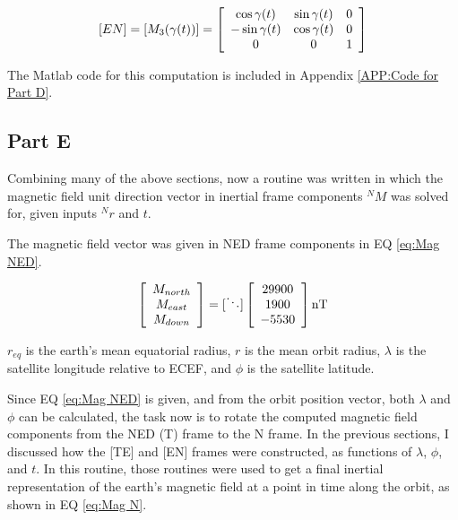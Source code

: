 \documentclass[]{aiaa-tc}%
\newcommand{\brackets} [1] {\left[ #1 \right]}
\newcommand{\arrayb}[2]{\brackets{ \begin{array}{#1}  #2 \end{array} } }
\begin{document}
\begin{equation}
	\label{EQ:ECI2ECF DCM}
	[EN]=[M_3(\gamma(t))] = 
	\arrayb{c c c}{
		\cos{\gamma(t)} 	& 	\sin{\gamma(t)} 	&	0	\\
		-\sin{\gamma(t)} 	&	\cos{\gamma(t)} 	& 	0	\\
		0			&		0		&	1			
	}
\end{equation}

The Matlab code for this computation is included in Appendix \ref{APP:Code for Part D}.



\subsection{Part E}
Combining many of the above sections, now a routine was written in which the magnetic field unit direction vector in inertial frame components $^NM$ was solved for, given inputs $^Nr$ and $t$. 

The magnetic field vector was given in NED frame components in EQ \ref{eq:Mag NED}.

\begin{equation}
	\label{eq:Mag NED}
	\arrayb{c}{M_{north} \\ M_{east} \\ M_{down}\\} 
	=
	[\ddots]\arrayb{c}{29900 \\ 1900 \\ -5530\\} \textnormal{nT}
\end{equation}

$r_{eq}$ is the earth's mean equatorial radius, $r$ is the mean orbit radius, $\lambda$ is the satellite longitude relative to ECEF, and $\phi$ is the satellite latitude. 

Since EQ \ref{eq:Mag NED} is given, and from the orbit position vector, both $\lambda$ and $\phi$ can be calculated, the task now is to rotate the computed magnetic field components from the NED (T) frame to the N frame. In the previous sections, I discussed how the [TE] and [EN] frames were constructed, as functions of $\lambda$, $\phi$, and $t$. In this routine, those routines were used to get a final inertial representation of the earth's magnetic field at a point in time along the orbit, as shown in EQ \ref{eq:Mag N}.
\end{document}
